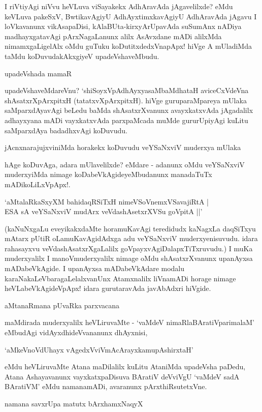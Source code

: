 I riVtiyAgi niVvu heVLuva viSayakekx AdhAravAda jAgavelilxde? eMdu keVLuva pakeSxV, BwtikavAgiyU AdhAyxtimxkavAgiyU AdhAravAda jAgavu I loVkavanunx vikAsapaDisi, kAlaBUta-kirxyArUpavAda suSumAnx nADiya madhayxgatavAgi pArxNagaLanunx alilx AsAvxdane mADi alilxMda nimamxgaLigelAlx oMdu guTuku koDutitxdedxVnapApx! hiVge A mUladiMda taMdu koDuvudakAkxgiyeV upadeVshaveMbudu.

upadeVshada mamaR

upadeVshaveMdareVnu? `shiSoyxVpAdhAyxyasaMbaMdhataH aviceCxVdeVna shAsatxrXpArxpitxH (tatatxvXpArxpitxH). hiVge guruparaMpareya mUlaka saMparxdAyavAgi beLedu baMda shAsatxrXvanunx avayxkatxvAda jAgadalilx adhayxyana mADi vayxkatxvAda parxpaMcada muMde gururUpiyAgi kuLitu saMparxdAya badadhxvAgi koDuvudu.

jAcnxnarajujxviniMda horakekx koDuvudu veYSaNxviV muderxya mUlaka

hAge koDuvAga, adara mUlavelilxde? eMdare - adanunx oMdu veYSaNxviV muderxyiMda nimage koDabeVkAgideyeMbudanunx manadaTuTx mADikoLiLxVpApx!.

\begin{shloka}
`aMtalaRkaSxyXM bahidaqRSiTxH nimeVSoVnemxVSavajiRtA |\\
ESA sA veYSaNxviV mudArx veVdashAsetxrXVSu goVpitA ||'
\end{shloka}

(kaNuNxgaLu eveyikakxdaMte horamuKavAgi teredidudx kaNagxLa daqSiTxyu mAtarx pUtiR oLamuKavAgidAdxga adu veYSaNxviV muderxyenisuvudu. idara rahasayxvu veVdashAsatxrXgaLalilx goVpayxvAgiDalapxTiTxruvudu.) I muKa muderxyalilx I manoVmuderxyalilx nimage oMdu shAsatxrXvanunx upanAyxsa mADabeVkAgide. I upanAyxsa mADabeVkAdare modalu karaNakaLeVbaragaLelalxvanUnx Atamxnalilx liVnamADi horage nimage heVLabeVkAgideVpApx! idara gurutaravAda javAbAdxri hiVgide.

aMtanaRmana pUvaRka parxvacana

maMdirada muderxyalilx heVLiruvaMte - `vaMdeV nimaRlaBAratiVparimalaM' eMbudAgi vidAyxdhideVvananunx dhAyxnisi,

\begin{shloka}
`aMkeVnoVdUhayx vAgedxVviVmAcArayxkamupAshirxtaH'
\end{shloka}

eMdu heVLiruvaMte Atana maDilalilx kuLitu AtaniMda upadeVsha paDedu, Atana Ashayavanunx vayxkatxpaDisuva BAratiV deVviVgU `vaMdeV sadA BAratiVM' eMdu namanamADi, avaranunx pArxthiRsutetxVne.

namana savxrUpa matutx bArxhamxNaqyX

